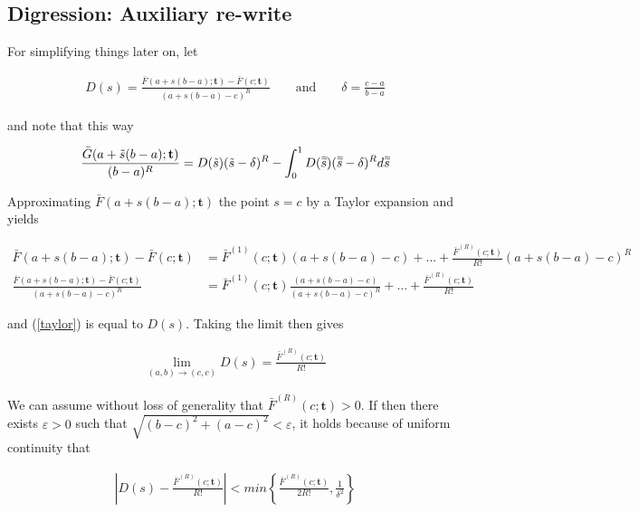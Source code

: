 \documentclass{article}
\newcommand{\dbtilde}[1]{\accentset{\approx}{#1}}
\begin{document}
\subsection*{Digression: Auxiliary re-write}

For simplifying things later on, let

\begin{align*}
    D(s) = \frac{\bar{F}(a+s(b-a);\mathbf{t}) - \bar{F}(c;\mathbf{t})}{(a + s(b-a) - c)^R} \qquad \text{and} \qquad \delta = \frac{c-a}{b-a}
\end{align*}

and note that this way

\begin{align}
    \frac{\bar{G}(a+\tilde{s}(b-a); \mathbf{t})}{(b-a)^R} = D(\tilde{s}) (\tilde{s} - \delta)^R - \int_0^1 D(\dbtilde{s})(\dbtilde{s} - \delta)^R d\dbtilde{s} \label{g_bar}
\end{align}

Approximating $\bar{F}(a + s(b-a); \mathbf{t})$ the point $s=c$ by a Taylor expansion and yields

\begin{align}
    \bar{F}(a + s(b-a); \mathbf{t}) - \bar{F}(c; \mathbf{t}) &= \bar{F}^{(1)}(c; \mathbf{t})(a + s(b-a) - c) + ... + \frac{\bar{F}^{(R)}(c; \mathbf{t})}{R!}(a + s(b-a) - c)^R \nonumber \\
    \frac{\bar{F}(a + s(b-a); \mathbf{t}) - \bar{F}(c; \mathbf{t})}{(a + s(b-a) - c)^R} &= \bar{F}^{(1)}(c; \mathbf{t}) \frac{(a + s(b-a) - c)}{(a + s(b-a) - c)^R} + ... + \frac{\bar{F}^{(R)}(c; \mathbf{t})}{R!} \label{taylor}
\end{align}

and (\ref{taylor}) is equal to $D(s)$. Taking the limit then gives 

\begin{align}
    \lim_{(a,b) \rightarrow (c,c)} D(s) = \frac{\bar{F}^{(R)}(c; \mathbf{t})}{R!} \label{limit_D(s)}
\end{align}

We can assume without loss of generality that $\bar{F}^{(R)}(c; \mathbf{t}) > 0$. If then there exists $\varepsilon > 0$ such that $\sqrt{(b-c)^2 + (a-c)^2} < \varepsilon$, it holds because of uniform continuity that

\begin{align}
    \left | D(s) - \frac{\bar{F}^{(R)}(c; \mathbf{t})}{R!}\right | < min \left \{  \frac{\bar{F}^{(R)}(c; \mathbf{t})}{2R!}, \frac{1}{\delta^2} \right \} \label{minimum}
\end{align}
 
\end{document}
